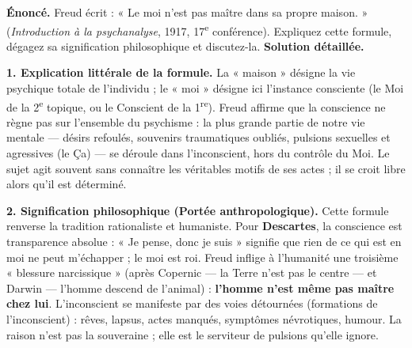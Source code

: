 \documentclass[11pt]{article}
\newcommand{\cle}[1]{{\popxbold\color{popdark}#1}}
\begin{document}
\begin{exoresolu}
\textbf{Énoncé.} Freud écrit : « Le moi n'est pas maître dans sa propre maison. » (\emph{Introduction à la psychanalyse}, 1917, 17\textsuperscript{e} conférence). Expliquez cette formule, dégagez sa signification philosophique et discutez-la.
\tcblower
\textbf{Solution détaillée.}

\textbf{1. Explication littérale de la formule.}
La « maison » désigne la vie psychique totale de l'individu ; le « moi » désigne ici l'instance consciente (le Moi de la 2\textsuperscript{e} topique, ou le Conscient de la 1\textsuperscript{re}). Freud affirme que la conscience ne règne pas sur l'ensemble du psychisme : la plus grande partie de notre vie mentale — désirs refoulés, souvenirs traumatiques oubliés, pulsions sexuelles et agressives (le \cle{Ça}) — se déroule dans l'\cle{inconscient}, hors du contrôle du Moi. Le sujet agit souvent sans connaître les véritables motifs de ses actes ; il se croit libre alors qu'il est déterminé.

\textbf{2. Signification philosophique (Portée anthropologique).}
Cette formule renverse la tradition rationaliste et humaniste. Pour \textbf{Descartes}, la conscience est transparence absolue : « Je pense, donc je suis » signifie que rien de ce qui est en moi ne peut m'échapper ; le moi est roi. Freud inflige à l'humanité une troisième « \cle{blessure narcissique} » (après Copernic — la Terre n'est pas le centre — et Darwin — l'homme descend de l'animal) : \textbf{l'homme n'est même pas maître chez lui}. L'inconscient se manifeste par des voies détournées (formations de l'inconscient) : rêves, lapsus, actes manqués, symptômes névrotiques, humour. La raison n'est pas la souveraine ; elle est le serviteur de pulsions qu'elle ignore.


\end{exoresolu}
\end{document}
